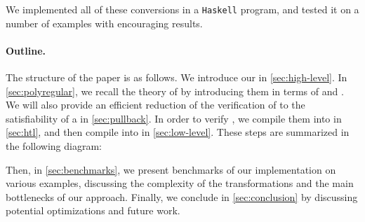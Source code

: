 We implemented all of these conversions in a \texttt{Haskell} program, and
tested it on a number of examples with encouraging results. 


\paragraph{Outline.} The structure of the paper is as follows. We introduce our
 in \cref{sec:high-level}. In \cref{sec:polyregular},
we recall the theory of  by introducing them in terms
of  and . We will also
provide an efficient reduction of the verification of  to the
satisfiability of a  in \cref{sec:pullback}.
In order to verify , we compile them into  in \cref{sec:htl}, and then compile  into
 in \cref{sec:low-level}. These steps 
are summarized in the following diagram:
\begin{center}
\end{center}
Then, in \cref{sec:benchmarks}, we present
benchmarks of our implementation on various examples, discussing
the complexity of the transformations and the main bottlenecks of our approach.
Finally, we conclude in \cref{sec:conclusion} by discussing potential
optimizations and future work.

